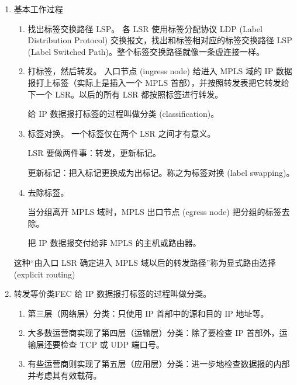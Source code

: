 \documentclass[11pt]{article}
\begin{document}
\begin{enumerate}
\begin{enumerate}
\begin{enumerate}
\begin{itemize}
\item 可以使用多种数据链路层协议，如 PPP、以太网、ATM 以及帧中继等。
\end{itemize}

\item MPLS域
MPLS 域 (MPLS domain) ：指该域中有许多彼此相邻的路由器，并且所有的路由器都是支持 MPLS 技术的标记交换路由器 LSR (Label Switching Router)。

LSR 同时具有标记交换和路由选择这两种功能。标记交换功能是为了快速转发，路由选择功能是为了构造转发表。
\end{enumerate}
\item 基本工作过程
\label{sec:org4c846c1}
\begin{enumerate}
\item 找出标签交换路径 LSP。
各 LSR 使用标签分配协议 LDP (Label Distribution Protocol) 交换报文，找出和标签相对应的标签交换路径 LSP (Label Switched Path)。整个标签交换路径就像一条虚连接一样。
\item 打标签，然后转发。
入口节点 (ingress node) 给进入 MPLS 域的 IP 数据报打上标签（实际上是插入一个 MPLS 首部），并按照转发表把它转发给下一个 LSR。以后的所有 LSR 都按照标签进行转发。

给 IP 数据报打标签的过程叫做分类 (classification)。
\item 标签对换。
一个标签仅在两个 LSR 之间才有意义。

LSR 要做两件事：转发，更新标记。

更新标记：把入标记更换成为出标记。称之为标签对换 (label swapping)。
\item 去除标签。

当分组离开 MPLS 域时，MPLS 出口节点 (egress node) 把分组的标签去除。

把 IP 数据报交付给非 MPLS 的主机或路由器。
\end{enumerate}
这种“由入口 LSR 确定进入 MPLS 域以后的转发路径”称为显式路由选择 (explicit routing)


\item 转发等价类FEC
\label{sec:orgf3e6003}
给 IP 数据报打标签的过程叫做分类。
\begin{enumerate}
\item 第三层（网络层）分类：只使用 IP 首部中的源和目的 IP 地址等。
\item 大多数运营商实现了第四层（运输层）分类：除了要检查 IP 首部外，运输层还要检查 TCP 或 UDP 端口号。
\item 有些运营商则实现了第五层（应用层）分类：进一步地检查数据报的内部并考虑其有效载荷。
\end{enumerate}


\end{enumerate}
\end{enumerate}
\end{document}
